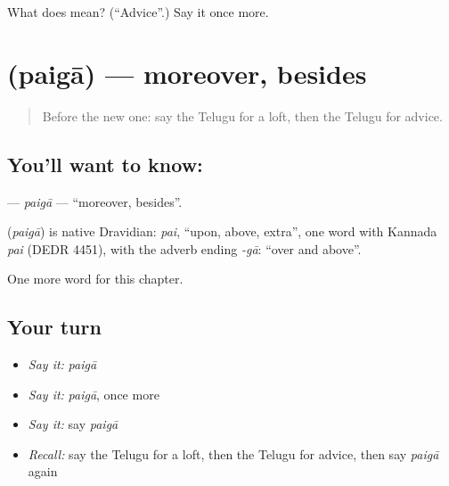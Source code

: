 \begin{tcolorbox}[breakable,colback=teal!4,colframe=teal!35!black,title={Before you move on}]
What does  mean? (\textquotedblleft{}Advice\textquotedblright{}.) Say it once more.
\end{tcolorbox}
\section[\texorpdfstring{\te{పైగా} (paigā)}{పైగా (paigā)}]{ (paigā) — moreover, besides}

\label{lesson:TE-C294-paiga}



\begin{quote}
Before the new one: say the Telugu for a loft, then the Telugu for advice.
\end{quote}

\subsection*{You'll want to know: }
\textbf{} — \emph{paigā} — \textquotedblleft{}moreover, besides\textquotedblright{}.

\begin{cousinweb}
\textbf{} (\emph{paigā}) is native Dravidian: \emph{pai}, \textquotedblleft{}upon, above, extra\textquotedblright{}, one word with Kannada \emph{pai} (DEDR 4451), with the adverb ending \emph{-gā}: \textquotedblleft{}over and above\textquotedblright{}.
\end{cousinweb}

\begin{grammarlens}[title={What you've built}]
One more word for this chapter.
\end{grammarlens}

\subsection*{Your turn}
\begin{itemize}
\raggedright
  \item \emph{Say it:} \emph{paigā}
  \item \emph{Say it:} \emph{paigā}, once more
  \item \emph{Say it:} say \emph{paigā}
  \item \emph{Recall:} say the Telugu for a loft, then the Telugu for advice, then say \emph{paigā} again
\end{itemize}

